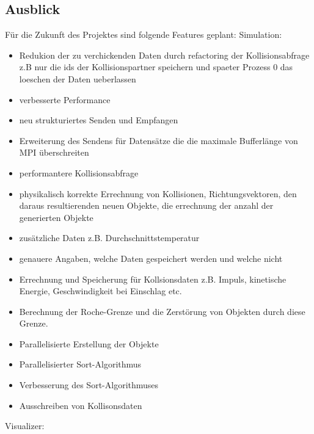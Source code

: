 \subsection{Ausblick}
Für die Zukunft des Projektes sind folgende Features geplant:
Simulation:
\begin{itemize}
    \item Redukion der zu verchickenden Daten durch refactoring der Kollisionsabfrage
          z.B nur die ids der Kollisionspartner speichern und spaeter Prozess 0 das loeschen
          der Daten ueberlassen
    \item verbesserte Performance
    \item neu strukturiertes Senden und Empfangen
    \item Erweiterung des Sendens für Datensätze die die maximale Bufferlänge von MPI überschreiten
    \item performantere Kollisionsabfrage
    \item physikalisch korrekte Errechnung von Kollisionen, 
          Richtungsvektoren, den daraus resultierenden neuen Objekte,
          die errechnung der anzahl der generierten Objekte    
    \item zusätzliche Daten z.B. Durchschnittstemperatur
    \item genauere Angaben, welche Daten gespeichert werden und welche nicht
    \item Errechnung und Speicherung für Kollsionsdaten z.B. Impuls, kinetische Energie, Geschwindigkeit bei Einschlag etc.
    \item Berechnung der Roche-Grenze und die Zerstörung von Objekten durch diese Grenze.
    \item Parallelisierte Erstellung der Objekte
    \item Parallelisierter Sort-Algorithmus
    \item Verbesserung des Sort-Algorithmuses
    \item Ausschreiben von Kollisonsdaten

\end{itemize}
Visualizer:
